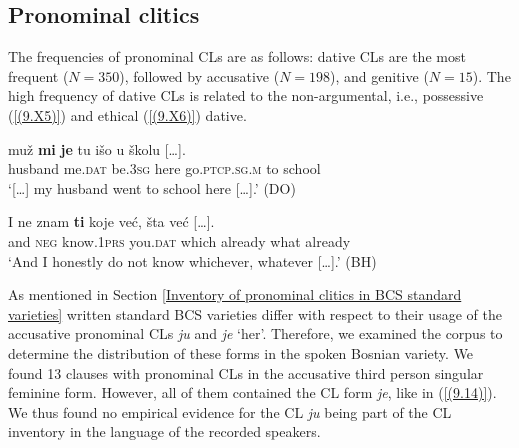 \subsection{Pronominal clitics}
\label{Pronominal clitics:9}
The frequencies of pronominal CLs are as follows: dative CLs are the most frequent ($N=350$), followed by accusative ($N=198$), and genitive ($N=15$). The high frequency of dative CLs is related to the non-argumental, i.e., possessive (\ref{(9.X5)}) and ethical (\ref{(9.X6)}) dative. 

\begin{exe}\ex\label{(9.X5)}
\gll  [\dots] muž \textbf{mi} \textbf{je} tu išo u {školu  [\dots].} \\
{} husband me.\textsc{dat} be.3\textsc{sg} here go.\textsc{ptcp}.\textsc{sg}.\textsc{m} to school \\
\glt ‘[\dots] my husband went to school here  [\dots].’ 
\hfill (DO)

\ex\label{(9.X6)}
\gll I ne znam \textbf{ti} koje već, šta {već  [\dots].}  \\
and \textsc{neg} know.1\textsc{prs} you.\textsc{dat} which already what already \\
\glt ‘And I honestly do not know whichever, whatever  [\dots].’ 
\hfill (BH)
\end{exe}

\noindent As mentioned in Section \ref{Inventory of pronominal clitics in BCS standard varieties} written standard BCS varieties differ with respect to their usage of the accusative pronominal CLs \textit{ju} and \textit{je} ‘her’. Therefore, we examined the corpus to determine the distribution of these forms in the spoken Bosnian variety. We found 13 clauses with pronominal CLs in the accusative third person singular feminine form. However, all of them contained the CL form \textit{je}, like in (\ref{(9.14)}). We thus found no empirical evidence for the CL \textit{ju} being part of the CL inventory in the language of the recorded speakers.


